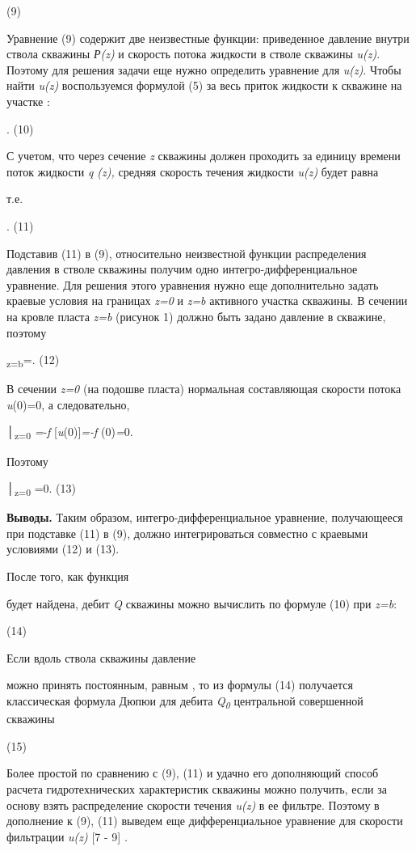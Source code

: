 (9)

Уравнение (9) содержит две неизвестные функции: приведенное давление
внутри ствола скважины \emph{Р(z)} и скорость потока жидкости в стволе
скважины \emph{u(z)}. Поэтому для решения задачи еще нужно определить
уравнение для \emph{u(z)}. Чтобы найти \emph{u(z)} воспользуемся
формулой (5) за весь приток жидкости к скважине на участке
:

.
(10)

С учетом, что через сечение \emph{z} скважины должен проходить за
единицу времени поток жидкости \emph{q (z),} средняя скорость течения
жидкости \emph{u(z)} будет равна

т.е.

.
(11)

Подставив (11) в (9), относительно неизвестной функции распределения
давления
в
стволе скважины получим одно интегро-дифференциальное уравнение. Для
решения этого уравнения нужно еще дополнительно задать краевые условия
на границах \emph{z=0} и \emph{z=b} активного участка скважины. В
сечении на кровле пласта \emph{z=b} (рисунок 1) должно быть задано
давление в скважине, поэтому

\textbar{}\textsubscript{z=b}=.
(12)

В сечении \emph{z=0} (на подошве пласта) нормальная составляющая
скорости потока \emph{u}(0)=0, а следовательно,

│\textsubscript{z=0}
\emph{=}-\emph{f} {[}\emph{u}(0){]}\emph{=-f} (0)\emph{=}0.

Поэтому

│\textsubscript{z=0}
=0. (13)

{\bfseries Выводы.} Таким образом, интегро-дифференциальное уравнение,
получающееся при подставке (11) в (9), должно интегрироваться совместно
с краевыми условиями (12) и (13).

После того, как функция

будет найдена, дебит \emph{Q} скважины можно вычислить по формуле (10)
при \emph{z=b}:


(14)

Если вдоль ствола скважины давление

можно принять постоянным, равным
, то
из формулы (14) получается классическая формула Дюпюи для дебита
\emph{Q\textsubscript{0}} центральной совершенной скважины


(15)

Более простой по сравнению с (9), (11) и удачно его дополняющий способ
расчета гидротехнических характеристик скважины можно получить, если за
основу взять распределение скорости течения \emph{u(z)} в ее фильтре.
Поэтому в дополнение к (9), (11) выведем еще дифференциальное уравнение
для скорости фильтрации \emph{u(z)} {[}7 - 9{]} .

